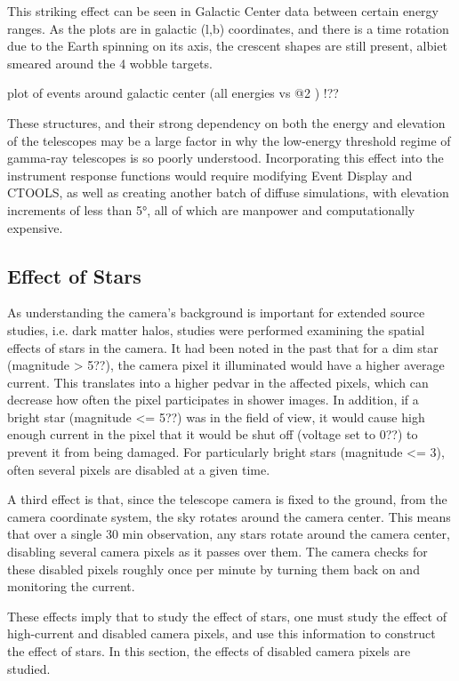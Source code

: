     This striking effect can be seen in Galactic Center data between certain energy ranges.
    As the plots are in galactic (l,b) coordinates, and there is a time rotation due to the Earth spinning on its axis, the crescent shapes are still present, albiet smeared around the 4 wobble targets.

    plot of events around galactic center (all energies vs @2 \TeV ) !??
    
    These structures, and their strong dependency on both the energy and elevation of the telescopes may be a large factor in why the low-energy threshold regime of gamma-ray telescopes is so poorly understood.
    Incorporating this effect into the instrument response functions would require modifying Event Display and CTOOLS, as well as creating another batch of diffuse simulations, with elevation increments of less than \ang{5}, all of which are manpower and computationally expensive.
    
    

  \subsection{Effect of Stars}
    As understanding the camera's background is important for extended source studies, i.e. dark matter halos, studies were performed examining the spatial effects of stars in the camera.
    It had been noted in the past that for a dim star (magnitude > 5??), the camera pixel it illuminated would have a higher average current.
    This translates into a higher pedvar in the affected pixels, which can decrease how often the pixel participates in shower images.
    In addition, if a bright star (magnitude <= 5??) was in the field of view, it would cause high enough current in the pixel that it would be shut off (voltage set to 0??) to prevent it from being damaged.
    For particularly bright stars (magnitude <= 3), often several pixels are disabled at a given time.

    A third effect is that, since the telescope camera is fixed to the ground, from the camera coordinate system, the sky rotates around the camera center.
    This means that over a single 30 min observation, any stars rotate around the camera center, disabling several camera pixels as it passes over them.
    The camera checks for these disabled pixels roughly once per minute by turning them back on and monitoring the current.

    These effects imply that to study the effect of stars, one must study the effect of high-current and disabled camera pixels, and use this information to construct the effect of stars.
    In this section, the effects of disabled camera pixels are studied.

